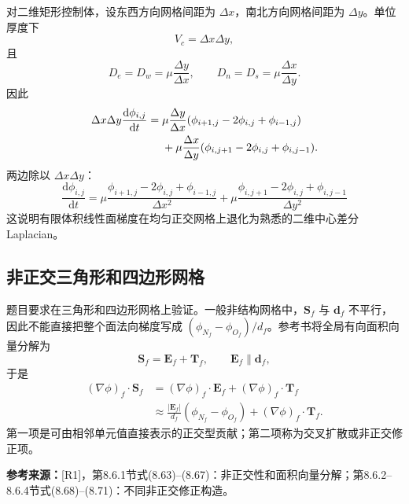 \documentclass[UTF8,12pt,a4paper]{ctexart}
\numberwithin{equation}{section}
\newcommand{\Rone}{\textnormal{[R1]}}
\newcommand{\source}[1]{%
  \par\smallskip
  \noindent\colorbox{sourcebg}{%
    \parbox{0.955\linewidth}{\raggedright\footnotesize\color{sourcegray}\textbf{参考来源：}#1}%
  }
  \par\smallskip
}
\newcommand{\Sf}{\bm S}
\newcommand{\Ef}{\bm E}
\newcommand{\Tf}{\bm T}
\begin{document}
对二维矩形控制体，设东西方向网格间距为 $\Delta x$，南北方向网格间距为 $\Delta y$。单位厚度下
\begin{equation}
  V_c=\Delta x\Delta y,
  \label{eq:rect_volume}
\end{equation}
且
\begin{equation}
  D_e=D_w=\mu\frac{\Delta y}{\Delta x},
  \qquad
  D_n=D_s=\mu\frac{\Delta x}{\Delta y}.
  \label{eq:rect_D}
\end{equation}
因此
\begin{align}
  \Delta x\Delta y\frac{\mathrm d\phi_{i,j}}{\mathrm dt}
  ={}&\mu\frac{\Delta y}{\Delta x}
  (\phi_{i+1,j}-2\phi_{i,j}+\phi_{i-1,j})
  \notag\\
  &+\mu\frac{\Delta x}{\Delta y}
  (\phi_{i,j+1}-2\phi_{i,j}+\phi_{i,j-1}).
  \label{eq:rect_before_divide}
\end{align}
两边除以 $\Delta x\Delta y$：
\begin{equation}
  \boxed{
  \frac{\mathrm d\phi_{i,j}}{\mathrm dt}
  =\mu\frac{\phi_{i+1,j}-2\phi_{i,j}+\phi_{i-1,j}}{\Delta x^2}
  +\mu\frac{\phi_{i,j+1}-2\phi_{i,j}+\phi_{i,j-1}}{\Delta y^2}}
  \label{eq:rect_laplacian}
\end{equation}
这说明有限体积线性面梯度在均匀正交网格上退化为熟悉的二维中心差分Laplacian。

\subsection{非正交三角形和四边形网格}

题目要求在三角形和四边形网格上验证。一般非结构网格中，$\Sf_f$ 与
$\bm d_f$ 不平行，因此不能直接把整个面法向梯度写成
$(\phi_{N_f}-\phi_{O_f})/d_f$。参考书将全局有向面积向量分解为
\begin{equation}
  \boxed{\Sf_f=\Ef_f+\Tf_f},
  \qquad
  \Ef_f\parallel\bm d_f,
  \label{eq:nonorth_decomposition}
\end{equation}
于是
\begin{align}
  (\nabla\phi)_f\cdot\Sf_f
  &=(\nabla\phi)_f\cdot\Ef_f
    +(\nabla\phi)_f\cdot\Tf_f
    \label{eq:split_grad_1}\\
  &\approx
    \frac{|\Ef_f|}{d_f}(\phi_{N_f}-\phi_{O_f})
    +(\nabla\phi)_f\cdot\Tf_f.
    \label{eq:split_grad_2}
\end{align}
第一项是可由相邻单元值直接表示的正交型贡献；第二项称为交叉扩散或非正交修正项。

\source{\Rone，第8.6.1节式(8.63)--(8.67)：非正交性和面积向量分解；第8.6.2--8.6.4节式(8.68)--(8.71)：不同非正交修正构造。}
\end{document}
